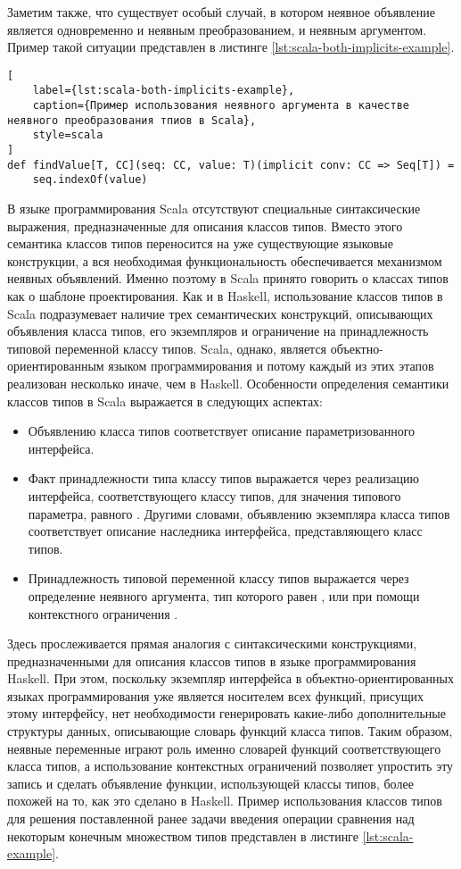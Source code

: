 Заметим также, что существует особый случай, в котором неявное объявление является одновременно и неявным преобразованием, и неявным аргументом. Пример такой ситуации представлен в листинге \ref{lst:scala-both-implicits-example}. 

\begin{lstlisting}[
    label={lst:scala-both-implicits-example},
    caption={Пример использования неявного аргумента в качестве неявного преобразования тпиов в Scala},
    style=scala
]
def findValue[T, CC](seq: CC, value: T)(implicit conv: CC => Seq[T]) = 
    seq.indexOf(value)
\end{lstlisting}

В языке программирования Scala отсутствуют специальные синтаксические выражения, предназначенные для описания классов типов. Вместо этого семантика классов типов переносится на уже существующие языковые конструкции, а вся необходимая функциональность обеспечивается механизмом неявных объявлений. Именно поэтому в Scala принято говорить о классах типов как о шаблоне проектирования. Как и в Haskell, использование классов типов в Scala подразумевает наличие трех семантических конструкций, описывающих объявления класса типов, его экземпляров и ограничение на принадлежность типовой переменной классу типов. Scala, однако, является объектно-ориентированным языком программирования и потому каждый из этих этапов реализован несколько иначе, чем в Haskell. Особенности определения семантики классов типов в Scala выражается в следующих аспектах:
\begin{itemize}
    \item Объявлению класса типов соответствует описание параметризованного интерфейса. 
    \item Факт принадлежности типа  классу типов выражается через реализацию интерфейса, соответствующего классу типов, для значения типового параметра, равного . Другими словами, объявлению экземпляра класса типов соответствует описание наследника интерфейса, представляющего класс типов.  
    \item Принадлежность типовой переменной  классу типов  выражается через определение неявного аргумента, тип которого равен , или при помощи контекстного ограничения .    
\end{itemize}
Здесь прослеживается прямая аналогия с синтаксическими конструкциями, предназначенными для описания классов типов в языке программирования Haskell. При этом, поскольку экземпляр интерфейса в объектно-ориентированных языках программирования уже является носителем всех функций, присущих этому интерфейсу, нет необходимости генерировать какие-либо дополнительные структуры данных, описывающие словарь функций класса типов. Таким образом, неявные переменные играют роль именно словарей функций соответствующего класса типов, а использование контекстных ограничений позволяет упростить эту запись и сделать объявление функции, использующей классы типов, более похожей на то, как это сделано в Haskell. Пример использования классов типов для решения поставленной ранее задачи введения операции сравнения над некоторым конечным множеством типов представлен в листинге \ref{lst:scala-example}.

